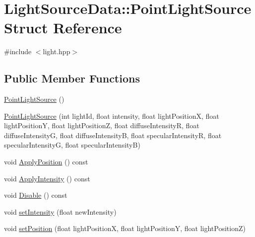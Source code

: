 \hypertarget{struct_light_source_data_1_1_point_light_source}{\section{Light\+Source\+Data\+:\+:Point\+Light\+Source Struct Reference}
\label{struct_light_source_data_1_1_point_light_source}
}


{\ttfamily \#include $<$light.\+hpp$>$}

\subsection*{Public Member Functions}
\begin{DoxyCompactItemize}
\item 
\hyperlink{struct_light_source_data_1_1_point_light_source_a810ee14860e62f45e93bfeaad8933247}{Point\+Light\+Source} ()
\item 
\hyperlink{struct_light_source_data_1_1_point_light_source_abcf0248c30097a775fee01fac024c69f}{Point\+Light\+Source} (int light\+Id, float intensity, float light\+Position\+X, float light\+Position\+Y, float light\+Position\+Z, float diffuse\+Intensity\+R, float diffuse\+Intensity\+G, float diffuse\+Intensity\+B, float specular\+Intensity\+R, float specular\+Intensity\+G, float specular\+Intensity\+B)
\item 
void \hyperlink{struct_light_source_data_1_1_point_light_source_a282a80169cee9f93ce61517463ec1599}{Apply\+Position} () const 
\item 
void \hyperlink{struct_light_source_data_1_1_point_light_source_a1e3f2921341e5c76d5e6a7c86806518e}{Apply\+Intensity} () const 
\item 
void \hyperlink{struct_light_source_data_1_1_point_light_source_aaf6c53acb771b0d12d9eb7170a32768a}{Disable} () const 
\item 
void \hyperlink{struct_light_source_data_1_1_point_light_source_a5ed61c49ceb54686c205b91a3673378e}{set\+Intensity} (float new\+Intensity)
\item 
void \hyperlink{struct_light_source_data_1_1_point_light_source_ab436f701f065419fd20dcee7f4132a8c}{set\+Position} (float light\+Position\+X, float light\+Position\+Y, float light\+Position\+Z)
\end{DoxyCompactItemize}
